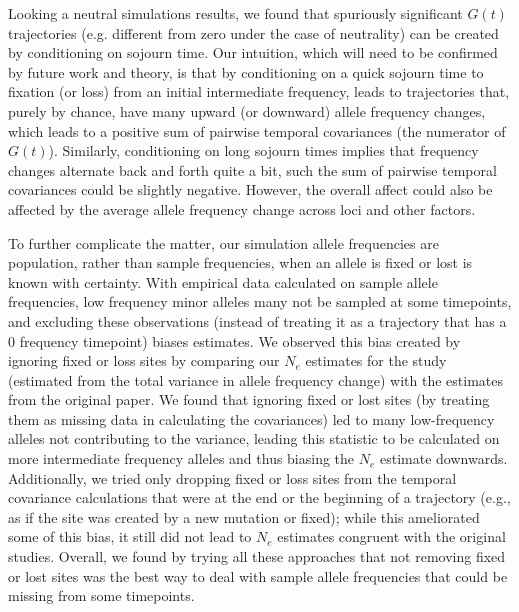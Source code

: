 \documentclass[11pt]{article}
\begin{document}
Looking a neutral simulations results, we found that spuriously significant
$G(t)$ trajectories (e.g. different from zero under the case of neutrality) can
be created by conditioning on sojourn time. Our intuition, which will need to
be confirmed by future work and theory, is that by conditioning on a quick
sojourn time to fixation (or loss) from an initial intermediate frequency,
leads to trajectories that, purely by chance, have many upward (or downward)
allele frequency changes, which leads to a positive sum of pairwise temporal
covariances (the numerator of $G(t)$). Similarly, conditioning on long sojourn
times implies that frequency changes alternate back and forth quite a bit, such
the sum of pairwise temporal covariances could be slightly negative. However,
the overall affect could also be affected by the average allele frequency
change across loci and other factors. 

To further complicate the matter, our simulation allele frequencies are
population, rather than sample frequencies, when an allele is fixed or lost is
known with certainty. With empirical data calculated on sample allele
frequencies, low frequency minor alleles many not be sampled at some
timepoints, and excluding these observations (instead of treating it as a
trajectory that has a 0 frequency timepoint) biases estimates.  We observed
this bias created by ignoring fixed or loss sites by comparing our $N_e$
estimates for the \textcite{Barghi2019-qy} study (estimated from the total
variance in allele frequency change) with the estimates from the original
paper. We found that ignoring fixed or lost sites (by treating them as missing
data in calculating the covariances) led to many low-frequency alleles not
contributing to the variance, leading this statistic to be calculated on more
intermediate frequency alleles and thus biasing the $N_e$ estimate downwards.
Additionally, we tried only dropping fixed or loss sites from the temporal
covariance calculations that were at the end or the beginning of a trajectory
(e.g., as if the site was created by a new mutation or fixed); while this
ameliorated some of this bias, it still did not lead to $N_e$ estimates
congruent with the original studies. Overall, we found by trying all these
approaches that not removing fixed or lost sites was the best way to deal with
sample allele frequencies that could be missing from some timepoints. 
\end{document}
